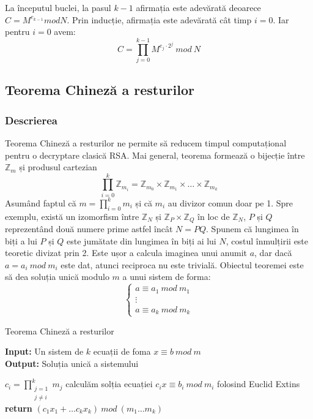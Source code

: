 \documentclass[12pt, oneside]{book}
\begin{document}
      
      La începutul buclei, la pasul $ k-1 $ afirmația este adevărată deoarece $ C = M^{e_{k-1}} mod N$. Prin inducție, afirmația este adevărată cât timp $ i=0$. Iar pentru $i=0$ avem: \\
      $$ C= \prod_{j=0}^{k-1} M^{e_j \cdot   2^j}  \ mod \ N $$
      
     \subsection{Teorema Chineză a resturilor}
      \subsubsection{Descrierea}
      Teorema Chineză a resturilor ne permite să reducem timpul computațional pentru o decryptare clasică RSA. Mai general, teorema formează o bijecție între $ \mathbb{Z}_m $ și produsul cartezian \\
      $$ \prod_{i=0}^{k} \mathbb{Z}_{m_i} = \mathbb{Z}_{m_0} \times \mathbb{Z}_{m_1} \times \dots \times  \mathbb{Z}_{m_k}$$
      Asumând faptul că $ m = \prod_{i=0}^{k} m_i $ și că $ m_i $ au divizor comun doar pe 1. Spre exemplu, există un izomorfism între $ \mathbb{Z}_N$ și $\mathbb{Z}_P \times \mathbb{Z}_Q  $ în loc de $ \mathbb{Z}_N $, $ P $ și $Q$ reprezentând două numere prime astfel încât $ N=PQ$. Spunem că lungimea în biți a lui $P$ și $Q$ este jumătate din lungimea în biți ai lui $N$, costul înmulțirii este teoretic divizat prin 2. Este ușor a calcula imaginea unui anumit $a$, dar dacă $ a= a_i \ mod \ m_i $ este dat, atunci reciproca nu este trivială. Obiectul teoremei este să dea soluția unică modulo $m$ a unui sistem de forma: \\
    \[
\left\{ 
\begin{array}{c}
a \equiv a_1 \ mod \ m_1 \\ 
 \vdots  \\ 
a \equiv a_k \ mod \ m_k
\end{array}
\right. 
\]

		  \begin{algorithm}[H]
		   \caption{Teorema Chineză a resturilor}
		   \textbf{Input:} Un sistem de $k$ ecuații de foma $x \equiv b \ mod \ m$ \\
		   \textbf{Output:} Soluția unică a sistemului
		   \begin{algorithmic}
		   	\State $c_i = \prod_{\substack{j=1 \\ j \neq i }}^{k} m_j$
		   	\EndFor
		   	\State calculăm solția ecuației $ c_ix \equiv b_i \ mod \ m_i $ folosind Euclid Extins 
		   	\EndFor
		   	\State \textbf{return} $(c_1x_1 + \dots c_kx_k) \ mod \ (m_1 \dots m_k) $ 
		   \end{algorithmic}
		   \end{algorithm}
		   
\end{document}
